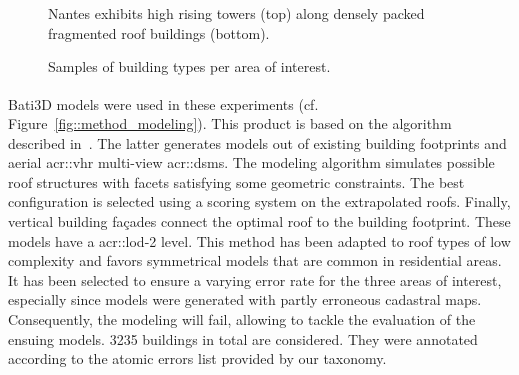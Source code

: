 \begin{figure}[htb]
{\begin{subfloatrow}[3]
{                    }{
                        \caption{
                            \label{subfig::nantes_samples}
                            Nantes exhibits high rising towers (top) along densely packed fragmented roof buildings (bottom).
                        }
                    }
                \end{subfloatrow}
            }{
                \caption{
                    \label{fig::samples}
                    Samples of building types per area of interest.
                }
            }
        \end{figure}

        Bati3D\textsuperscript{\textregistered} models were used in these experiments (cf. Figure~\ref{fig::method_modeling}).
        This product is based on the algorithm described in~\parencite{durupt2006automatic}.
        The latter generates models  out of existing building footprints and aerial \gls{acr::vhr} multi-view \glspl{acr::dsm}.
        The modeling algorithm simulates possible roof structures with facets satisfying some geometric constraints.
        The best configuration is selected using a scoring system on the extrapolated roofs.
        Finally, vertical building fa\c{c}ades connect the optimal roof to the building footprint.
        These models have a \gls{acr::lod}-2 level.
        This method has been adapted to roof types of low complexity and favors symmetrical models that are common in residential areas.
        It has been selected to ensure a varying error rate for the three areas of interest, especially since models were generated with partly erroneous cadastral maps.
        Consequently, the modeling will fail, allowing to tackle the evaluation of the ensuing models.
        \num{3235} buildings in total are considered.
        They were annotated according to the atomic errors list provided by our taxonomy.

